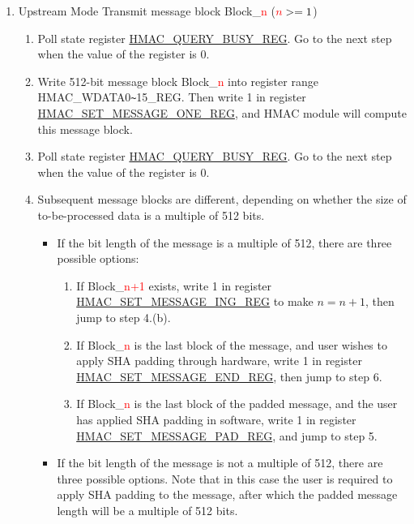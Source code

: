\documentclass[main\_\_EN.tex]{subfiles}
\begin{document}
\begin{enumerate}
    \item Upstream Mode
    Transmit message block Block\_\textcolor{red}{n} ($\textcolor{red}{n}>=1$)
    \begin{enumerate}
        \item Poll state register \hyperref[regdesc:HMACQUERYBUSYREG]{HMAC\_QUERY\_BUSY\_REG}. Go to the next step when the value of the register is 0.
        \item Write 512-bit message block Block\_\textcolor{red}{n} into register range HMAC\_WDATA0\verb+~+15\_REG. Then write 1 in register \hyperref[regdesc:HMACSETMESSAGEONEREG]{HMAC\_SET\_MESSAGE\_ONE\_REG}, and HMAC module will compute this message block.
        \item Poll state register \hyperref[regdesc:HMACQUERYBUSYREG]{HMAC\_QUERY\_BUSY\_REG}. Go to the next step when the value of the register is 0.
        \item Subsequent message blocks are different, depending on whether the size of to-be-processed data is a multiple of 512 bits.
        \begin{itemize}
            \item If the bit length of the message is a multiple of 512, there are three possible options:
            \begin{enumerate}
                \item If Block\_\textcolor{red}{n+1} exists, write 1 in register \hyperref[regdesc:HMACSETMESSAGEINGREG]{HMAC\_SET\_MESSAGE\_ING\_REG} to make $n=n+1$, then jump to step 4.(b).
                \item If Block\_\textcolor{red}{n} is the last block of the message, and user wishes to apply SHA padding through hardware, write 1 in register \hyperref[regdesc:HMACSETMESSAGEENDREG]{HMAC\_SET\_MESSAGE\_END\_REG}, then jump to step 6.
                \item If Block\_\textcolor{red}{n} is the last block of the padded message, and the user has applied SHA padding in software, write 1 in register \hyperref[regdesc:HMACSETMESSAGEPADREG]{HMAC\_SET\_MESSAGE\_PAD\_REG}, and jump to step 5.
            \end{enumerate}
            \item If the bit length of the message is not a multiple of 512, there are three possible options. Note that in this case the user is required to apply SHA padding to the message, after which the padded message length will be a multiple of 512 bits.
            \begin{enumerate}

\end{enumerate}
\end{itemize}
\end{enumerate}
\end{enumerate}
\end{document}
